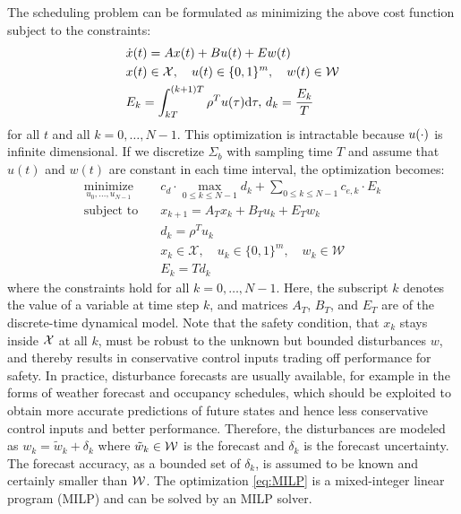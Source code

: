 The %
scheduling problem can be formulated as minimizing the above cost function subject to the constraints:
\begin{align*}
  & \dot{x} (t) = Ax (t) + Bu (t) + Ew (t)\\%
  & x (t) \in \mathcal{X}, \quad u(t) \in \{0,1\}^{m}, \quad w (t) \in \mathcal{W}\\%
  & E_k = \int_{kT}^{(k + 1) T} \rho^T u (\tau) \mathd \tau, \, d_k = \frac{E_k}{T}%
\end{align*}
 for all $t$ and all $k = 0, \ldots, N - 1$.
This optimization is intractable because $u (\cdot)$ is infinite
dimensional.
If we discretize $\Sigma_b$ with sampling time $T$ and assume that $u (t)$ and $w (t)$ are constant in each time interval, the optimization becomes:
\begin{align}
  \operatorname*{minimize}_{u_{0}, \ldots, u_{N - 1}} \quad & c_d \cdot \max_{0
  \leqslant k \leqslant N - 1} d_k + \textstyle\sum_{0 \leqslant k \leqslant N - 1}
  c_{e, k} \cdot E_k  \label{eq:MILP}\\
  \text{subject to} \quad & x_{k+1} = A_{T} x_{k} + B_{T} u_{k} + E_{T} w_{k}  \nonumber\\
  & d_k = \rho^T u_{k} \nonumber\\
  & x_{k} \in \mathcal{X}, \quad u_{k} \in \{0,1\}^{m}, \quad w_{k} \in \mathcal{W} \nonumber\\
  & E_k = T d_k \nonumber
\end{align}
where the constraints hold for all $k = 0, \ldots, N - 1$.
Here, the subscript $k$ denotes the value of a variable at time step $k$, and matrices $A_{T}$, $B_{T}$, and $E_{T}$ are of the discrete-time dynamical model.
Note that the safety condition, that $x_k$ stays inside $\mathcal{X}$ at all $k$, must be robust to the unknown but bounded disturbances $w$, and thereby results in conservative control inputs trading off performance for safety.
In practice, disturbance forecasts are usually available, for example in the forms of weather forecast and occupancy schedules, which should be exploited to obtain more accurate predictions of future states and hence less conservative control inputs and better performance.
Therefore, the disturbances are modeled as $w_{k} = \tilde{w}_{k} + \delta_{k}$ where $\tilde{w}_{k} \in \mathcal{W}$ is the forecast and $\delta_{k}$ is the forecast uncertainty.
The forecast accuracy, as a bounded set of $\delta_{k}$, is assumed to be known and certainly smaller than $\mathcal{W}$.
The optimization \eqref{eq:MILP} is a mixed-integer linear program (MILP) and can be solved by an MILP solver.

